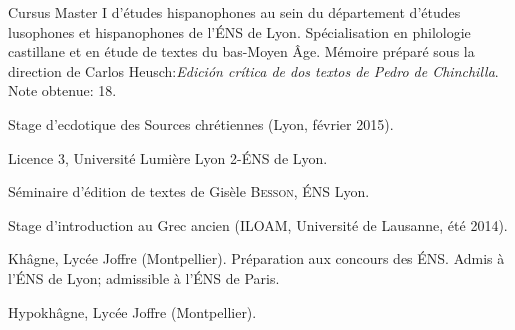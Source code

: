 \begin{rubric}{Cursus}
                                \entry*[2014-2015]
                            Master I d'études hispanophones au sein du département d'études
                        lusophones et hispanophones de l'ÉNS de Lyon. Spécialisation en philologie
                        castillane et en étude de textes du bas-Moyen Âge. Mémoire préparé sous la
                        direction de Carlos Heusch:\textit{Edición crítica de dos textos de Pedro de
                        Chinchilla}. Note obtenue: 18.
                    
                                \entry*
                            Stage d’ecdotique des Sources chrétiennes (Lyon, février
                        2015).
                    
                                \entry*[2013-2014]
                            Licence 3, Université Lumière Lyon 2-ÉNS de Lyon. 
                    
                                \entry*
                            Séminaire d’édition de textes de Gisèle
                        \textsc{Besson}, ÉNS Lyon.
                    
                                \entry*
                            Stage d'introduction au Grec ancien (ILOAM, Université de Lausanne,
                        été 2014).
                    
                                \entry*[2012-2013]
                            Khâgne, Lycée Joffre (Montpellier). Préparation aux concours des ÉNS.
                        Admis à l'ÉNS de Lyon; admissible à l'ÉNS de Paris.
                    
                                \entry*[2011-2012]
                            Hypokhâgne, Lycée Joffre (Montpellier).
                    \end{rubric}





